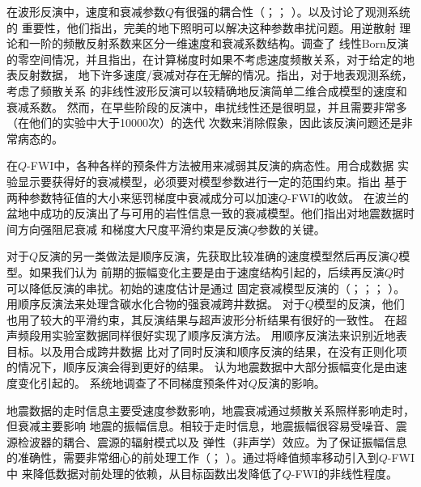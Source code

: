在波形反演中，速度和衰减参数$Q$有很强的耦合性（；；
）。以及讨论了观测系统的
重要性，他们指出，完美的地下照明可以解决这种参数串扰问题。用逆散射
理论和一阶的频散反射系数来区分一维速度和衰减系数结构。调查了
线性Born反演的零空间情况，并且指出，在计算梯度时如果不考虑速度频散关系，对于给定的地表反射数据，
地下许多速度/衰减对存在无解的情况。指出，对于地表观测系统，考虑了频散关系
的非线性波形反演可以较精确地反演简单二维合成模型的速度和衰减系数。
然而，在早些阶段的反演中，串扰线性还是很明显，并且需要非常多（在他们的实验中大于10000次）的迭代
次数来消除假象，因此该反演问题还是非常病态的。

在$Q$-FWI中，各种各样的预条件方法被用来减弱其反演的病态性。用合成数据
实验显示要获得好的衰减模型，必须要对模型参数进行一定的范围约束。指出
基于两种参数特征值的大小来惩罚梯度中衰减成分可以加速$Q$-FWI的收敛。
在波兰的盆地中成功的反演出了与可用的岩性信息一致的衰减模型。他们指出对地震数据时间方向强阻尼衰减
和梯度大尺度平滑约束是反演$Q$参数的关键。

对于$Q$反演的另一类做法是顺序反演，先获取比较准确的速度模型然后再反演$Q$模型。如果我们认为
前期的振幅变化主要是由于速度结构引起的，后续再反演$Q$时可以降低反演的串扰。初始的速度估计是通过
固定衰减模型反演的（；；；
）。用顺序反演法来处理含碳水化合物的强衰减跨井数据。
对于$Q$模型的反演，他们也用了较大的平滑约束，其反演结果与超声波形分析结果有很好的一致性。
在超声频段用实验室数据同样很好实现了顺序反演方法。
用顺序反演法来识别近地表目标。以及用合成跨井数据
比对了同时反演和顺序反演的结果，在没有正则化项的情况下，顺序反演会得到更好的结果。
认为地震数据中大部分振幅变化是由速度变化引起的。
系统地调查了不同梯度预条件对$Q$反演的影响。

地震数据的走时信息主要受速度参数影响，地震衰减通过频散关系照样影响走时，但衰减主要影响
地震的振幅信息。相较于走时信息，地震振幅很容易受噪音、震源检波器的耦合、震源的辐射模式以及
弹性（非声学）效应。为了保证振幅信息的准确性，需要非常细心的前处理工作（；
）。通过将峰值频率移动引入到$Q$-FWI中
来降低数据对前处理的依赖，从目标函数出发降低了$Q$-FWI的非线性程度。


